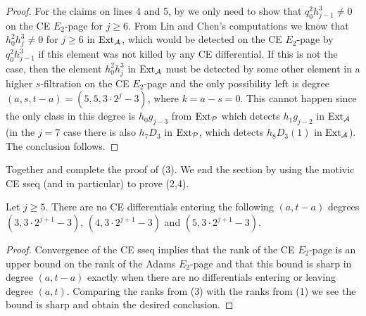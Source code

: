 \begin{proof}
For the claims on lines 4 and 5, by  we only need to show that  $q_0^2h_{j-1}^3 \neq 0$ on the CE $E_2$-page for $j \geq 6$.
  From Lin and Chen's computations we know that $h_0^2h_{j}^3 \neq 0$ for $j \geq 6$ in $\operatorname{\mathrm{Ext}}_{\operatorname{\mathcal{A}}}$, which
  would be detected on the CE $E_2$-page by $q_0^2h_{j-1}^3$ if this element was not killed by any CE differential.
  If this is not the case, then the element $h_0^2h_{j}^3$ in $\operatorname{\mathrm{Ext}}_{\operatorname{\mathcal{A}}}$ must be detected by some other element in a higher $s$-filtration on the  CE $E_2$-page and the only possibility left is degree $(a,s,t-a) = (5,5, 3\cdot 2^j - 3)$, where $k=a-s=0$.
  This cannot happen since the only class in this degree is $h_0g_{j-3}$ from $\operatorname{\mathrm{Ext}}_{\mathcal{P}}$ which detects $h_1g_{j-2}$ in $\operatorname{\mathrm{Ext}}_{\operatorname{\mathcal{A}}}$ (in the $j=7$ case there is also $h_7D_3$ in $\operatorname{\mathrm{Ext}}_{\mathcal{P}}$, which detects $h_8D_3(1)$ in $\operatorname{\mathrm{Ext}}_{\operatorname{\mathcal{A}}}$). The conclusion follows.
\end{proof}

Together  and  complete the proof of (3).
We end the section by using the motivic CE sseq (and  in particular) to prove (2,4).

\begin{lem} \label{lem:entering hj3}
  Let $j \geq 5$.
  There are no CE differentials entering the following $(a,t-a)$ degrees
  $(3, 3 \cdot 2^{j+1}-3)$, $(4, 3 \cdot 2^{j+1}-3)$ and $(5, 3 \cdot 2^{j+1}-3)$.
\end{lem}

\begin{proof}
  Convergence of the CE sseq implies that the
  rank of the CE $E_2$-page is an upper bound on the rank of the Adams $E_2$-page
  and that this bound is sharp in degree $(a,t-a)$ exactly when there are no differentials entering or leaving degree $(a,t)$.
  Comparing the ranks from (3) with the ranks from (1)
  we see the bound is sharp and obtain the desired conclusion.    
\end{proof}


